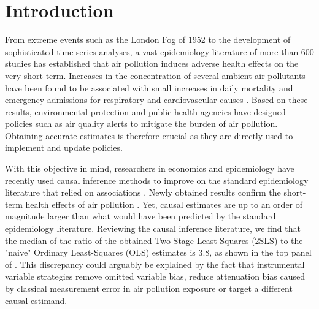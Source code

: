 \documentclass[12pt]{article}
\begin{document}
\onehalfspacing




\section{Introduction}
     
    From extreme events such as the London Fog of 1952 to the development of sophisticated time-series analyses, a vast epidemiology literature of more than 600 studies has established that air pollution induces adverse health effects on the very short-term. Increases in the concentration of several ambient air pollutants have been found to be associated with small increases in daily mortality and emergency admissions for respiratory and cardiovascular causes \citep{schwartz1994people, samet2000national, le2002short, bell2004time, liu_ambient_2019}. Based on these results, environmental protection and public health agencies have designed policies such as air quality alerts to mitigate the burden of air pollution. Obtaining accurate estimates is therefore crucial as they are directly used to implement and update policies. 
    
    With this objective in mind, researchers in economics and epidemiology have recently used causal inference methods to improve on the standard epidemiology literature that relied on associations \citep{dominici_best_2017, bind_causal_2019}. Newly obtained results confirm the short-term health effects of air pollution \citep{schwartz_estimating_2015, schwartz_national_2018, deryugina_mortality_2019}. Yet, causal estimates are up to an order of magnitude larger than what would have been predicted by the standard epidemiology literature. Reviewing the causal inference literature, we find that the median of the ratio of the obtained Two-Stage Least-Squares (2SLS) to the "naive" Ordinary Least-Squares (OLS) estimates is 3.8, as shown in the top panel of . This discrepancy could arguably be explained by the fact that instrumental variable strategies remove omitted variable bias, reduce attenuation bias caused by classical measurement error in air pollution exposure or target a different causal estimand. 
    
\end{document}
